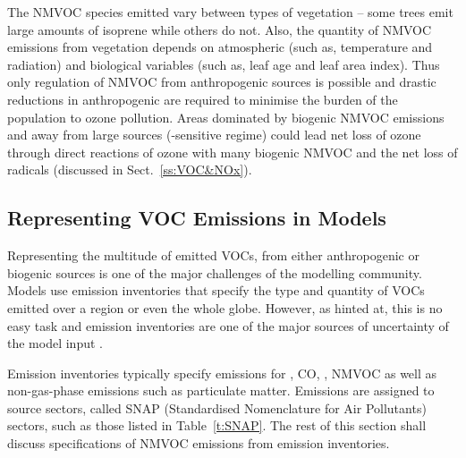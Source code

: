 The NMVOC species emitted vary between types of vegetation -- some trees emit large amounts of isoprene while others do not.
Also, the quantity of NMVOC emissions from vegetation depends on atmospheric (such as, temperature and radiation) and biological variables (such as, leaf age and leaf area index).
Thus only regulation of NMVOC from anthropogenic sources is possible and drastic reductions in anthropogenic  are required to minimise the burden of the population to ozone pollution.
Areas dominated by biogenic NMVOC emissions and away from large  sources (-sensitive regime) could lead net loss of ozone through direct reactions of ozone with many biogenic NMVOC and the net loss of radicals (discussed in Sect.~\ref{ss:VOC&NOx}).

\subsection{Representing VOC Emissions in Models}
Representing the multitude of emitted VOCs, from either anthropogenic or biogenic sources is one of the major challenges of the modelling community.
Models use emission inventories that specify the type and quantity of VOCs emitted over a region or even the whole globe.
However, as hinted at, this is no easy task and emission inventories are one of the major sources of uncertainty of the model input \citep{Russell:2000}.

Emission inventories typically specify emissions for , CO, , NMVOC as well as non-gas-phase emissions such as particulate matter.
Emissions are assigned to source sectors, called SNAP (Standardised Nomenclature for Air Pollutants) sectors, such as those listed in Table~\ref{t:SNAP}.
The rest of this section shall discuss specifications of NMVOC emissions from emission inventories.

